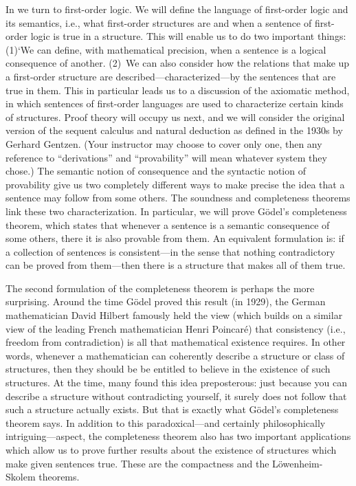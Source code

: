 In  we turn to first-order logic. We will define the
language of first-order logic and its semantics, i.e., what
first-order structures are and when a sentence of first-order logic is
true in a structure. This will enable us to do two important things:
(1)`We can define, with mathematical precision, when a sentence is a
logical consequence of another. (2)~We can also consider how the
relations that make up a first-order structure are
described---characterized---by the sentences that are true in them.
This in particular leads us to a discussion of the axiomatic method,
in which sentences of first-order languages are used to characterize
certain kinds of structures. Proof theory will occupy us next, and we
will consider the original version of the sequent calculus and natural
deduction as defined in the 1930s by Gerhard Gentzen. (Your instructor
may choose to cover only one, then any reference to ``derivations''
and ``provability'' will mean whatever system they chose.) The
semantic notion of consequence and the syntactic notion of provability
give us two completely different ways to make precise the idea that a
sentence may follow from some others. The soundness and completeness
theorems link these two characterization. In particular, we will prove
G\"odel's completeness theorem, which states that whenever a sentence
is a semantic consequence of some others, there it is also provable
from them. An equivalent formulation is: if a collection of sentences
is consistent---in the sense that nothing contradictory can be proved
from them---then there is a structure that makes all of them true.

The second formulation of the completeness theorem is perhaps the more
surprising. Around the time G\"odel proved this result (in 1929), the
German mathematician David Hilbert famously held the view (which builds on a similar view of the leading French mathematician Henri Poincar\'e) that
consistency (i.e., freedom from contradiction) is all that mathematical
existence requires. In other words, whenever a mathematician can
coherently describe a structure or class of structures, then they
should be be entitled to believe in the existence of such structures.
At the time, many found this idea preposterous: just because you can
describe a structure without contradicting yourself, it surely does
not follow that such a structure actually exists. But that is exactly
what G\"odel's completeness theorem says. In addition to this
paradoxical---and certainly philosophically intriguing---aspect, the
completeness theorem also has two important applications which allow
us to prove further results about the existence of structures which
make given sentences true. These are the compactness and the
L\"owenheim-Skolem theorems.

